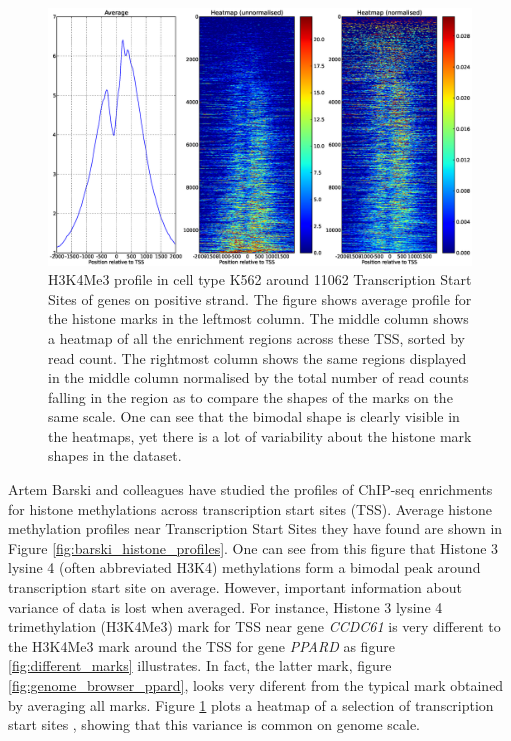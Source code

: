 \documentclass[12pt,a4paper]{article}
\begin{document}
\begin{figure}[p]
    \centering 
    \includegraphics[width=\textwidth]{images/introduction/heatmap_k562-h3k4me3.eps}
    \caption{H3K4Me3 profile in cell type K562 around 11062 Transcription Start Sites of genes on positive strand. The figure shows average profile for the histone marks in the leftmost column. The middle column shows a heatmap of all the enrichment regions across these TSS, sorted by read count. The rightmost column shows the same regions displayed in the middle column normalised by the total number of read counts falling in the region as to compare the shapes of the marks on the same scale. One can see that the bimodal shape is clearly visible in the heatmaps, yet there is a lot of variability about the histone mark shapes in the dataset.}
    \label{fig:k562_positive_strand_heatmap}
\end{figure}

Artem Barski and colleagues have studied the profiles of ChIP-seq enrichments
for histone methylations across transcription start sites (TSS). Average
histone methylation profiles near Transcription Start Sites they have found are
shown in Figure \ref{fig:barski_histone_profiles}. One can see from this figure
that Histone 3 lysine 4 (often abbreviated H3K4) methylations form a bimodal
peak around transcription start site on average.  However, important
information about variance of data is lost when averaged.  For instance,
Histone 3 lysine 4 trimethylation (H3K4Me3) mark for TSS near gene
\emph{CCDC61} is very different to the H3K4Me3 mark around the TSS for gene
\emph{PPARD} as figure \ref{fig:different_marks} illustrates. In fact, the
latter mark, figure \ref{fig:genome_browser_ppard}, looks very diferent from
the typical mark obtained by averaging all marks. Figure
\ref{fig:k562_positive_strand_heatmap} plots a heatmap of a selection of
transcription start sites
, 
showing that this variance is common on genome scale.
\end{document}
